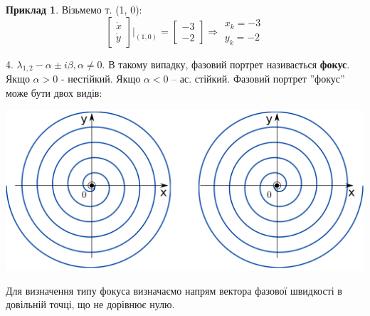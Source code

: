 \documentclass[14pt,a4paper]{scrartcl}
\theoremstyle{definition}
\newtheorem*{example}{Приклад}
\theoremstyle{definition}
\theoremstyle{definition}
\begin{document}
\begin{example}
Візьмемо т. (1, 0):
$$
\begin{bmatrix}
 \dot{x} \\
 \dot{y}
\end{bmatrix} \Bigg|_{(1,0)} = \begin{bmatrix}
 -3 \\
 -2
\end{bmatrix} \Longrightarrow \begin{gathered}
 x_k = -3 \\
 y_k = -2
\end{gathered}
$$

\end{example}

4. $\lambda_{1, 2} - \alpha \pm i\beta, \alpha\neq 0$. В такому випадку, фазовий портрет називається \textbf{фокус}. Якщо $ \alpha > 0$ - нестійкий. Якщо $ \alpha < 0$ -- ас. стійкий.
Фазовий портрет ''фокус'' може бути двох видів:
\begin{center} \includegraphics[scale=0.3]{assets/lectures_recent-9fe11a21.png} \end{center}
Для визначення типу фокуса визначаємо напрям вектора фазової швидкості в довільній точці, що не дорівнює нулю.
\end{document}
